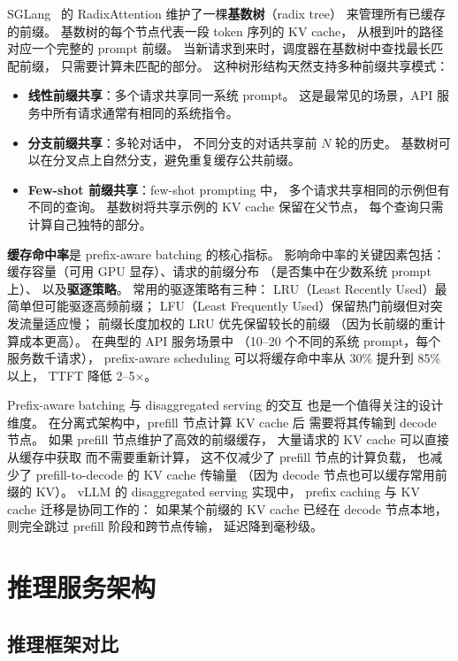 SGLang~\cite{zheng2024sglang} 的 RadixAttention
维护了一棵\textbf{基数树}（radix tree）
来管理所有已缓存的前缀。
基数树的每个节点代表一段 token 序列的 KV cache，
从根到叶的路径对应一个完整的 prompt 前缀。
当新请求到来时，调度器在基数树中查找最长匹配前缀，
只需要计算未匹配的部分。
这种树形结构天然支持多种前缀共享模式：
\begin{itemize}[noitemsep]
  \item \textbf{线性前缀共享}：多个请求共享同一系统 prompt。
        这是最常见的场景，API 服务中所有请求通常有相同的系统指令。
  \item \textbf{分支前缀共享}：多轮对话中，
        不同分支的对话共享前 $N$ 轮的历史。
        基数树可以在分叉点上自然分支，避免重复缓存公共前缀。
  \item \textbf{Few-shot 前缀共享}：few-shot prompting 中，
        多个请求共享相同的示例但有不同的查询。
        基数树将共享示例的 KV cache 保留在父节点，
        每个查询只需计算自己独特的部分。
\end{itemize}

\textbf{缓存命中率}是 prefix-aware batching 的核心指标。
影响命中率的关键因素包括：
缓存容量（可用 GPU 显存）、请求的前缀分布
（是否集中在少数系统 prompt 上）、
以及\textbf{驱逐策略}。
常用的驱逐策略有三种：
LRU（Least Recently Used）最简单但可能驱逐高频前缀；
LFU（Least Frequently Used）保留热门前缀但对突发流量适应慢；
前缀长度加权的 LRU 优先保留较长的前缀
（因为长前缀的重计算成本更高）。
在典型的 API 服务场景中
（10--20 个不同的系统 prompt，每个服务数千请求），
prefix-aware scheduling 可以将缓存命中率从 30\% 提升到 85\% 以上，
TTFT 降低 2--5$\times$。

Prefix-aware batching 与 disaggregated serving 的交互
也是一个值得关注的设计维度。
在分离式架构中，prefill 节点计算 KV cache 后
需要将其传输到 decode 节点。
如果 prefill 节点维护了高效的前缀缓存，
大量请求的 KV cache 可以直接从缓存中获取
而不需要重新计算，
这不仅减少了 prefill 节点的计算负载，
也减少了 prefill-to-decode 的 KV cache 传输量
（因为 decode 节点也可以缓存常用前缀的 KV）。
vLLM 的 disaggregated serving 实现中，
prefix caching 与 KV cache 迁移是协同工作的：
如果某个前缀的 KV cache 已经在 decode 节点本地，
则完全跳过 prefill 阶段和跨节点传输，
延迟降到毫秒级。


\section{推理服务架构}

\subsection{推理框架对比}

